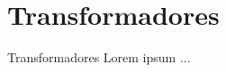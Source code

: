 \section{Transformadores}
\label{s.transformer}

\begin{frame}{Transformadores}
	Lorem ipsum ...
\end{frame}

